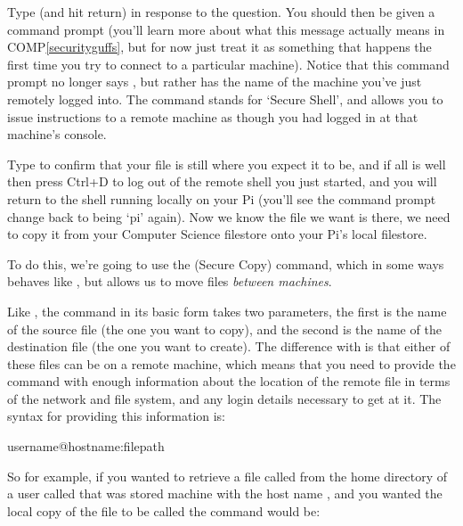 Type  (and hit return) in response to the question. You should then be given a command prompt (you'll learn more about what this message actually means in COMP\ref{securityguffs}, but for now just treat it as something that happens the first time you try to connect to a particular machine). Notice that this command prompt no longer says , but rather has the name of the machine you've just remotely logged into. The  command stands for `Secure Shell', and allows you to issue instructions to a remote machine as though you had logged in at that machine's console. 

Type  to confirm that your  file is still where you expect it to be, and if all is well then press Ctrl+D to log out of the remote shell you just started, and you will return to the shell running locally on your Pi (you'll see the command prompt change back to being `pi' again). Now we know the file we want is there, we need to copy it from your Computer Science filestore onto your Pi's local filestore.

To do this, we're going to use the  (Secure Copy) command, which in some ways behaves like , but allows us to move files \textit{between machines}. 

Like , the  command in its basic form takes two parameters, the first is the name of the source file (the one you want to copy), and the second is the name of the destination file (the one you want to create). The difference with  is that either of these files can be on a remote machine, which means that you need to provide the command with enough information about the location of the remote file in terms of the network and file system, and any login details necessary to get at it. The syntax for providing this information is:

\begin{ttoutenv}
username@hostname:filepath
\end{ttoutenv}

So for example, if you wanted to retrieve a file called  from the home directory of a user called  that was stored machine with the host name , and you wanted the local copy of the file to be called  the command would be:


